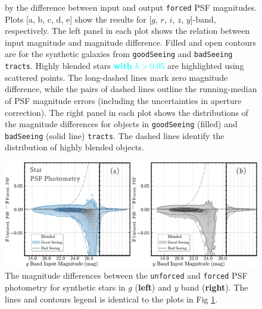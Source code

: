 \documentclass[useamsfonts]{pasj01}
\def\forced{\texttt{forced}}
\def\unforced{\texttt{unforced}}
\def\tracts{\texttt{tracts}}
\newcommand{\song}[1]{\textcolor{cyan} {\textbf{#1}}}
\begin{document}
\begin{figure}
{        by the difference between input and output \forced{} PSF magnitudes.
        Plots [a, b, c, d, e] show the results for [$g$, $r$, $i$, $z$, $y$]-band, 
        respectively.
        The left panel in each plot shows the relation between input magnitude and
        magnitude difference.
        Filled and open contours are for the synthetic galaxies 
        from \texttt{goodSeeing} and \texttt{badSeeing} \tracts{}.
        Highly blended stars \song{with $b>0.05$} are highlighted using scattered 
        points.
        The long-dashed lines mark zero magnitude difference, while the pairs of
        dashed lines outline the running-median of PSF magnitude errors
        (including the uncertainties in aperture correction).
        The right panel in each plot shows the distributions of the magnitude 
        differences for objects in \texttt{goodSeeing} (filled) and \texttt{badSeeing}
        (solid line) \tracts{}.
        The dashed lines identify the distribution of highly blended objects.
        }
    \label{fig:psf_mag}
\end{figure}

\begin{figure}
    \begin{center}
        \includegraphics[width=\textwidth]{fig/synpipe_psf_diff}
    \end{center}
    \caption{
        The magnitude differences between the \unforced{} and \forced{}
        PSF photometry for synthetic stars in $g$ (\textbf{left}) and $y$ band
        (\textbf{right}).
        The lines and contours legend is identical to the plots in Fig \ref{fig:psf_mag}.
        }
    \label{fig:psf_diff}
\end{figure}
\end{document}
